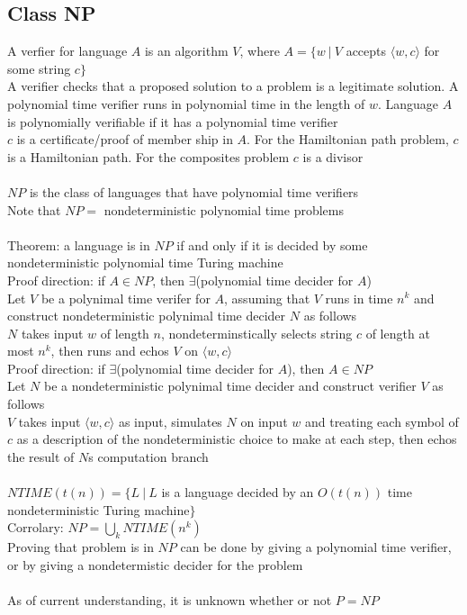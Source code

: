 \documentclass{article}
\newcommand*{\<}{\langle}
\renewcommand*{\>}{\rangle}
\begin{document}
		\subsection{Class NP}
			A verfier for language $A$ is an algorithm $V$, where $A = \{w\:|\:V$ accepts $\<w, c\>$ for some string $c\}$ \\
			A verifier checks that a proposed solution to a problem is a legitimate solution. A polynomial time verifier runs in polynomial time in the length of $w$. Language $A$ is polynomially verifiable if it has a polynomial time verifier \\
			$c$ is a certificate/proof of member ship in $A$. For the Hamiltonian path problem, $c$ is a Hamiltonian path. For the composites problem $c$ is a divisor \\
			\\
			$NP$ is the class of languages that have polynomial time verifiers \\
			Note that $NP =$ nondeterministic polynomial time problems \\
			\\
			Theorem: a language is in $NP$ if and only if it is decided by some nondeterministic polynomial time Turing machine \\
			Proof direction: if $A \in NP$, then $\exists$(polynomial time decider for $A$) \\
			Let $V$ be a polynimal time verifer for $A$, assuming that $V$ runs in time $n^k$ and construct nondeterministic polynimal time decider $N$ as follows \\
			$N$ takes input $w$ of length $n$, nondeterminstically selects string $c$ of length at most $n^k$, then runs and echos $V$ on $\<w, c\>$ \\
			Proof direction: if $\exists$(polynomial time decider for $A$), then $A \in NP$ \\
			Let $N$ be a nondeterministic polynimal time decider and construct verifier $V$ as follows \\
			$V$ takes input $\<w, c\>$ as input, simulates $N$ on input $w$ and treating each symbol of $c$ as a description of the nondeterministic choice to make at each step, then echos the result of $N$s computation branch \\
			\\
			$NTIME(t(n)) = \{L\:|\:L$ is a language decided by an $O(t(n))$ time nondeterministic Turing machine$\}$ \\
			Corrolary: $NP = \bigcup_k NTIME(n^k)$ \\
			Proving that problem is in $NP$ can be done by giving a polynomial time verifier, or by giving a nondetermistic decider for the problem \\
			\\
			As of current understanding, it is unknown whether or not $P = NP$
\end{document}
